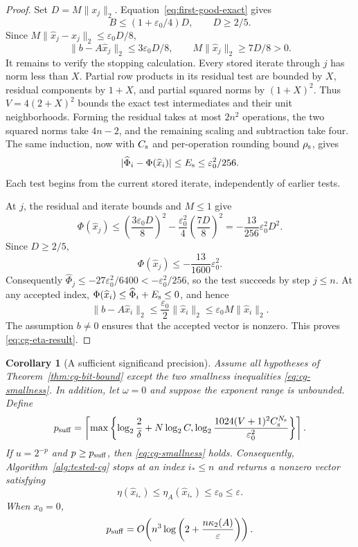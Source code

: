 \documentclass[11pt]{article}
\newtheorem{corollary}{Corollary}
\theoremstyle{definition}
\begin{document}
\begin{proof}
Set $D=M\|x_j\|_2$.  Equation~\eqref{eq:first-good-exact} gives
\begin{equation}
 B\le(1+\varepsilon_0/4)D,\qquad D\ge2/5.
 \label{eq:D-floor}
\end{equation}
Since $M\|\widehat x_j-x_j\|_2\le\varepsilon_0D/8$,
\[
 \|b-A\widehat x_j\|_2\le3\varepsilon_0D/8,\qquad
 M\|\widehat x_j\|_2\ge7D/8>0.
\]
It remains to verify the stopping calculation.  Every stored iterate
through $j$ has norm less than $X$.  Partial row products in its
residual test are bounded by $X$, residual components by $1+X$,
and partial squared norms by $(1+X)^2$.
Thus $V=4(2+X)^2$ bounds the exact test intermediates and their
unit neighborhoods.  Forming the residual takes at most $2n^2$
operations, the two squared norms take $4n-2$, and the remaining
scaling and subtraction take four.  The same induction, now with
$C_{\rm s}$ and per-operation rounding bound $\rho_{\rm s}$, gives
\begin{equation}
 |\widehat\Phi_i-\Phi(\widehat x_i)|\le E_{\rm s}
 \le\varepsilon_0^2/256.
 \label{eq:selector-certified-error}
\end{equation}
Each test begins from the current stored iterate, independently of
earlier tests.

At $j$, the residual and iterate bounds and $M\le1$ give
\[
 \Phi(\widehat x_j)
 \le\left(\frac{3\varepsilon_0D}{8}\right)^2
 -\frac{\varepsilon_0^2}{4}\left(\frac{7D}{8}\right)^2
 =-\frac{13}{256}\varepsilon_0^2D^2.
\]
Since $D\ge2/5$,
\begin{equation}
 \Phi(\widehat x_j)\le-\frac{13}{1600}\varepsilon_0^2.
 \label{eq:selector-margin}
\end{equation}
Consequently
$\widehat\Phi_j\le-27\varepsilon_0^2/6400
<-\varepsilon_0^2/256$, so the test succeeds by step $j\le n$.
At any accepted index,
$\Phi(\widehat x_i)\le\widehat\Phi_i+E_{\rm s}\le0$, and hence
\[
 \|b-A\widehat x_i\|_2\le\frac{\varepsilon_0}{2}\|\widehat x_i\|_2
 \le\varepsilon_0M\|\widehat x_i\|_2.
\]
The assumption $b\ne0$ ensures that the accepted vector is nonzero. This proves
\eqref{eq:cg-eta-result}.
\end{proof}

\begin{corollary}[A sufficient significand precision]
\label{cor:cg-bit-count}
Assume all hypotheses of Theorem~\ref{thm:cg-bit-bound} except the two
smallness inequalities \eqref{eq:cg-smallness}.  In addition, let $\omega=0$
and suppose the exponent range is unbounded.  Define
\begin{equation}
 p_{\rm suff}=\left\lceil\max\left\{
  \log_2\frac{2}{\delta}+N\log_2C,
  \log_2\frac{1024(V+1)^2C_{\rm s}^{N_{\rm s}}}{\varepsilon_0^2}
 \right\}\right\rceil.
 \label{eq:cg-p-bound}
\end{equation}
If $u=2^{-p}$ and $p\ge p_{\rm suff}$, then
\eqref{eq:cg-smallness} holds.  Consequently,
Algorithm~\ref{alg:tested-cg} stops at an index $i_*\le n$ and returns a
nonzero vector satisfying
\[
 \eta(\widehat x_{i_*})
 \le\eta_A(\widehat x_{i_*})
 \le\varepsilon_0\le\varepsilon.
\]
When $x_0=0$,
\[
 p_{\rm suff}
 =O\!\left(n^3\log\left(2+\frac{n\kappa_2(A)}{\varepsilon}\right)\right).
\]
\end{corollary}
\end{document}
